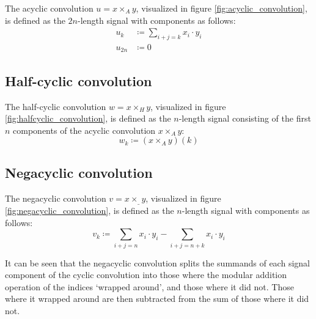 The acyclic convolution $u = x \times_A y$, visualized in figure
\ref{fig:acyclic_convolution}, is defined as the $2n$-length signal with
components as follows:
\begin{align*}
		u_k & \coloneqq \sum_{i + j = k} x_i \cdot y_i \\
		u_{2n} & \coloneqq 0
\end{align*}

\subsection{Half-cyclic convolution}

The half-cyclic convolution $w = x \times_H y$, visualized in figure
\ref{fig:halfcyclic_convolution}, is defined as the $n$-length signal
consisting of the first $n$ components of the acyclic convolution $x \times_A
y$:
\[
		w_k \coloneqq (x \times_A y)(k)
\]

\subsection{Negacyclic convolution}

The negacyclic convolution $v = x \times_\_ y$, visualized in figure
\ref{fig:negacyclic_convolution}, is defined as the $n$-length signal with
components as follows:
\[
		v_k \coloneqq \sum_{i + j = n} x_i \cdot y_i - \sum_{i + j = n + k} x_i \cdot y_i
\]

It can be seen that the negacyclic convolution splits the summands of each
signal component of the cyclic convolution into those where the modular
addition operation of the indices `wrapped around', and those where it did not.
Those where it wrapped around are then subtracted from the sum of those where
it did not.

